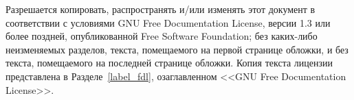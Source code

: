 
Разрешается копировать, распространять и/или изменять этот документ в
соответствии с условиями GNU Free Documentation License, версии 1.3 или
более поздней, опубликованной Free Software Foundation; без каких-либо
неизменяемых разделов, текста, помещаемого на первой странице обложки, и
без текста, помещаемого на последней странице обложки. Копия текста
лицензии представлена в Разделе~\ref{label_fdl}, озаглавленном <<GNU Free
Documentation License>>.

\newpage
